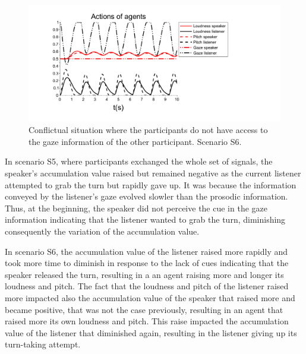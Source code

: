 

\begin{figure}
  \centering
  \includegraphics[width=\linewidth]{figure/adapt_nogaze.pdf}
  \caption{Conflictual situation where the participants do not have access to the gaze information of the other participant. Scenario S6.}
  \label{adapt_nogaze}
\end{figure}

In scenario S5, where participants exchanged the whole set of signals, the speaker's accumulation value raised but remained negative as the current listener attempted to grab the turn but rapidly gave up. It was because the information conveyed by the listener's gaze evolved slowler than the prosodic information. Thus, at the beginning, the speaker did not perceive the cue in the gaze information indicating that the listener wanted to grab the turn, diminishing consequently the variation of the accumulation value. 

In scenario S6, the accumulation value of the listener raised more rapidly and took more time to diminish in response to the lack of cues indicating that the speaker released the turn, resulting in a an agent raising more and longer its loudness and pitch. The fact that the loudness and pitch of the listener raised more impacted also the accumulation value of the speaker that raised more and became positive, that was not the case previously, resulting in an agent that raised more its own loudness and pitch. This raise impacted the accumulation value of the listener that diminished again, resulting in the listener giving up its turn-taking attempt. 

